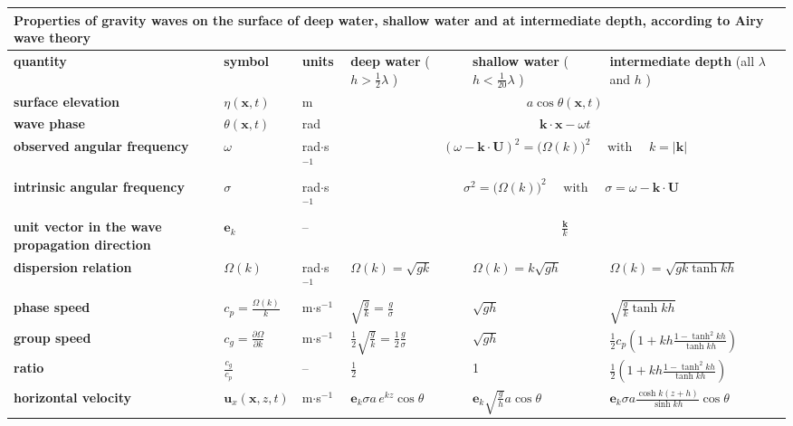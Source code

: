 \documentclass[a4paper,12pt]{report}
\begin{document}
\begin{longtable}[c]{|p{}|p{}|p{}|p{}|p{}|p{}|}
\hline
\multicolumn{6}{|p{0.8\textwidth}|}{\textbf{Properties of gravity waves on the surface of deep water, shallow water and at intermediate depth, according to Airy wave theory}} \\
\hline
\textbf{quantity} & \textbf{symbol} & \textbf{units} & \textbf{deep water} ( $ h > \frac{1}{2}\lambda $ ) & \textbf{shallow water} ( $ h < \frac{1}{20}\lambda $ ) & \textbf{intermediate depth} (all $ \lambda $ and $ h $ ) \\
\hline\endhead
\textbf{surface elevation} & $\eta(\mathbf{x},t)$ & m & \multicolumn{3}{c|}{$a \cos \theta(\mathbf{x},t)$} \\
\hline
\textbf{wave phase} & $\theta(\mathbf{x},t)$ & rad & \multicolumn{3}{c|}{$\mathbf{k}\cdot\mathbf{x} - \omega t$} \\
\hline
\textbf{observed angular frequency} & $\omega$ & rad$\cdot$s$^{-1}$ & \multicolumn{3}{c|}{$ \left( \omega - \mathbf{k}\cdot\mathbf{U} \right)^2 = \bigl( \Omega(k) \bigr)^2 \quad \text{ with } \quad k= |\mathbf{k}| $} \\
\hline
\textbf{intrinsic angular frequency} & $\sigma$ & rad$\cdot$s$^{-1}$ & \multicolumn{3}{c|}{$ \quad \sigma^2 = \bigl( \Omega(k) \bigr)^2 \quad \text{ with } \quad \sigma = \omega - \mathbf{k}\cdot\mathbf{U} $} \\
\hline
\textbf{unit vector in the wave propagation direction} & $\mathbf{e}_k$ & – & \multicolumn{3}{c|}{$\frac{\mathbf{k}}{k}$} \\
\hline
\textbf{dispersion relation} & $\Omega(k)$ & rad$\cdot$s$^{-1}$ & $\Omega(k) = \sqrt{g k}$ & $\Omega(k) = k \sqrt{g h}$ & $\Omega(k) = \sqrt{g k \tanh k h}$ \\
\hline
\textbf{phase speed} & $c_p=\frac{\Omega(k)}{k}$ & m$\cdot$s$^{-1}$ & $\sqrt{\frac{g}{k}} = \frac{g}{\sigma}$ & $\sqrt{g h}$ & $\sqrt{\frac{g}{k} \tanh k h}$ \\
\hline
\textbf{group speed} & $c_g = \frac{\partial\Omega}{\partial k}$ & m$\cdot$s$^{-1}$ & $\frac{1}{2} \sqrt{\frac{g}{k}} = \frac{1}{2} \frac{g}{\sigma}$ & $\sqrt{g h}$ & $\frac{1}{2} c_p \left( 1 + k h \frac{1 - \tanh^2 k h}{\tanh k h} \right)$ \\
\hline
\textbf{ratio} & $\frac{c_g}{c_p}$ & – & $\frac{1}{2}$ & 1 & $\frac{1}{2} \left( 1 + k h \frac{1 - \tanh^2 k h}{\tanh k h} \right)$ \\
\hline
\textbf{horizontal velocity} & $\mathbf{u}_x(\mathbf{x},z,t)$ & m$\cdot$s$^{-1}$ & $\mathbf{e}_k \sigma a\, e^{k z} \cos \theta$ & $\mathbf{e}_k \sqrt{\frac{g}{h}} a \cos \theta$ & $\mathbf{e}_k \sigma a \frac{\cosh k (z+h) }{\sinh k h} \cos \theta$ \\

\end{longtable}
\end{document}
